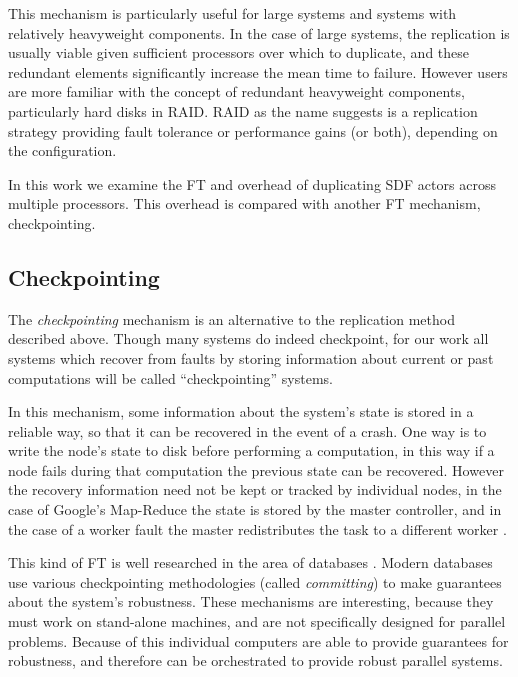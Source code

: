 This mechanism is particularly useful for large systems and systems with relatively heavyweight components.
In the case of large systems, the replication is usually viable given sufficient processors over which to duplicate, and these redundant elements significantly increase the mean time to failure.
However users are more familiar with the concept of redundant heavyweight components, particularly hard disks in RAID.
RAID as the name suggests is a replication strategy providing fault tolerance or performance gains (or both), depending on the configuration.

In this work we examine the FT and overhead of duplicating SDF actors across multiple processors.
This overhead is compared with another FT mechanism, checkpointing.

\subsection{Checkpointing}
The {\em checkpointing} mechanism is an alternative to the replication method described above.
Though many systems do indeed checkpoint, for our work all systems which recover from faults by storing information about current or past computations will be called ``checkpointing'' systems.

In this mechanism, some information about the system's state is stored in a reliable way, so that it can be recovered in the event of a crash.
One way is to write the node's state to disk before performing a computation, in this way if a node fails during that computation the previous state can be recovered.
However the recovery information need not be kept or tracked by individual nodes, in the case of Google's Map-Reduce the state is stored by the master controller, and in the case of a worker fault the master redistributes the task to a different worker \cite{dea08}.

This kind of FT is well researched in the area of databases \cite{dbrec}.
Modern databases use various checkpointing methodologies (called {\em committing}) to make guarantees about the system's robustness.
These mechanisms are interesting, because they must work on stand-alone machines, and are not specifically designed for parallel problems.
Because of this individual computers are able to provide guarantees for robustness, and therefore can be orchestrated to provide robust parallel systems.
